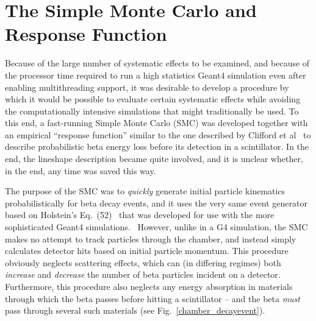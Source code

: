 


\section{The Simple Monte Carlo and Response Function}
\label{sec:lineshape}
Because of the large number of systematic effects to be examined, and because of the processor time required to run a high statistics Geant4 simulation even after enabling multithreading support, it was desirable to develop a procedure by which it would be possible to evaluate certain systematic effects while avoiding the computationally intensive simulations that might traditionally be used.  To this end, a fast-running Simple Monte Carlo (SMC) was developed together with an empirical ``response function'' similar to the one described by Clifford et al~\cite{clifford} to describe probabilistic beta energy loss before its detection in a scintillator.  In the end, the lineshape description became quite involved, and it is unclear whether, in the end, any time was saved this way. 

The purpose of the SMC was to \emph{quickly} generate initial particle kinematics probabilistically for beta decay events, and it uses the very same event generator based on Holstein's Eq.~(52)~\cite{holstein} that was developed for use with the more sophisticated Geant4 simulations.~  However, unlike in a G4 simulation, the SMC makes no attempt to track particles through the chamber, and instead simply calculates detector hits based on initial particle momentum.  This procedure obviously neglects scattering effects, which can (in differing regimes) both \emph{increase} and \emph{decrease} the number of beta particles incident on a detector.  Furthermore, this procedure also neglects any energy absorption in materials through which the beta passes before hitting a scintillator -- and the beta \emph{must} pass through several such materials (see Fig.~\ref{chamber_decayevent}).

